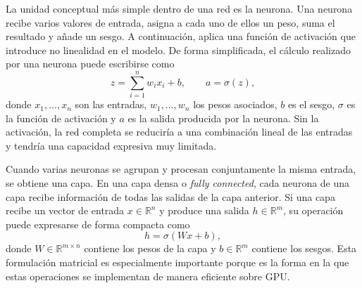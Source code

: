 La unidad conceptual más simple dentro de una red es la neurona. Una neurona recibe varios valores de entrada, asigna a cada uno de ellos un peso, suma el resultado y añade un sesgo. A continuación, aplica una función de activación que introduce no linealidad en el modelo. De forma simplificada, el cálculo realizado por una neurona puede escribirse como
\[
z = \sum_{i=1}^{n} w_i x_i + b,
\qquad
a = \sigma(z),
\]
donde $x_1, \dots, x_n$ son las entradas, $w_1, \dots, w_n$ los pesos asociados, $b$ es el sesgo, $\sigma$ es la función de activación y $a$ es la salida producida por la neurona. Sin la activación, la red completa se reduciría a una combinación lineal de las entradas y tendría una capacidad expresiva muy limitada.

Cuando varias neuronas se agrupan y procesan conjuntamente la misma entrada, se obtiene una capa. En una capa densa o \textit{fully connected}, cada neurona de una capa recibe información de todas las salidas de la capa anterior. Si una capa recibe un vector de entrada $x \in \mathbb{R}^{n}$ y produce una salida $h \in \mathbb{R}^{m}$, su operación puede expresarse de forma compacta como
\[
h = \sigma(Wx + b),
\]
donde $W \in \mathbb{R}^{m \times n}$ contiene los pesos de la capa y $b \in \mathbb{R}^{m}$ contiene los sesgos. Esta formulación matricial es especialmente importante porque es la forma en la que estas operaciones se implementan de manera eficiente sobre GPU.

